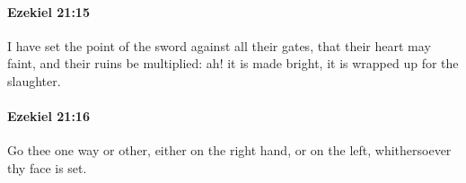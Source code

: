 		\paragraph{Ezekiel 21:15} %
			\label{EZEKIEL-21-15}

			I have set the point of the sword against all their gates, that their heart may faint, and their ruins be multiplied: ah! it is made bright, it is wrapped up for the slaughter.


		\paragraph{Ezekiel 21:16} %
			\label{EZEKIEL-21-16}

			Go thee one way or other, either on the right hand, or on the left, whithersoever thy face is set.


